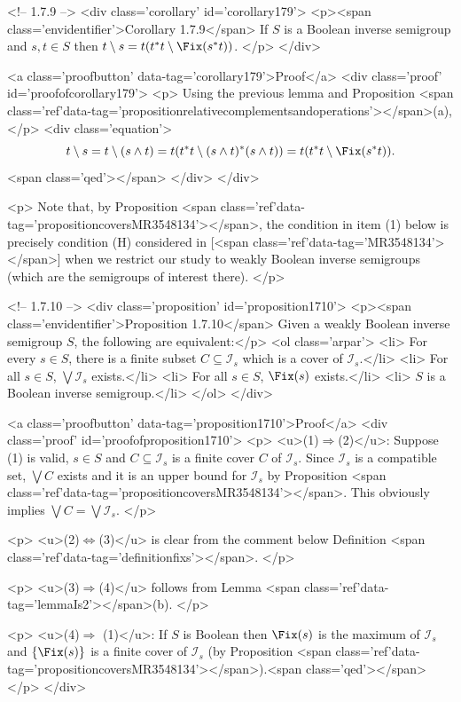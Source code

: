 <!-- 1.7.9 -->
<div class='corollary' id='corollary179'>
	<p><span class='envidentifier'>Corollary 1.7.9</span>
	If $S$ is a Boolean inverse semigroup and $s,t\in S$ then $t\setminus s=t(t^*t\setminus\Fix(s^*t))$.
	</p>
</div>

<a class='proofbutton' data-tag='corollary179'>Proof</a>
<div class='proof' id='proofofcorollary179'>
	<p>
	Using the previous lemma and Proposition <span class='ref'data-tag='propositionrelativecomplementsandoperations'></span>(a),</p>
	<div class='equation'>\[
	t\setminus s=t\setminus(s\land t)=t(t^*t\setminus(s\land t)^*(s\land t))=t(t^*t\setminus\Fix(s^*t)).
	\]<span class='qed'></span>
	</div>
</div>

<p>
Note that, by Proposition <span class='ref'data-tag='propositioncoversMR3548134'></span>, the condition in item (1) below is precisely condition (H) considered in [<span class='ref'data-tag='MR3548134'></span>] when we restrict our study to weakly Boolean inverse semigroups (which are the semigroups of interest there).
</p>

<!-- 1.7.10 -->
<div class='proposition' id='proposition1710'>
	<p><span class='envidentifier'>Proposition 1.7.10</span>
	Given a weakly Boolean inverse semigroup $S$, the following are equivalent:</p>
	<ol class='arpar'>
		<li> For every $s\in S$, there is a finite subset $C\subseteq\mathcal{I}_s$ which is a cover of $\mathcal{I}_s$.</li>
		<li> For all $s\in S$, $\bigvee\mathcal{I}_s$ exists.</li>
		<li> For all $s\in S$, $\Fix(s)$ exists.</li>
		<li> $S$ is a Boolean inverse semigroup.</li>
	</ol>
</div>

<a class='proofbutton' data-tag='proposition1710'>Proof</a>
<div class='proof' id='proofofproposition1710'>
	<p>
	<u>(1)$\Rightarrow$(2)</u>: Suppose (1) is valid, $s\in S$ and $C\subseteq\mathcal{I}_s$ is a finite cover $C$ of $\mathcal{I}_s$. Since $\mathcal{I}_s$ is a compatible set, $\bigvee C$ exists and it is an upper bound for $\mathcal{I}_s$ by Proposition <span class='ref'data-tag='propositioncoversMR3548134'></span>. This obviously implies $\bigvee C=\bigvee\mathcal{I}_s$.
	</p>

	<p>
	<u>(2)$\iff$(3)</u> is clear from the comment below Definition <span class='ref'data-tag='definitionfixs'></span>.
	</p>

	<p>
	<u>(3)$\Rightarrow$(4)</u> follows  from Lemma <span class='ref'data-tag='lemmaIs2'></span>(b).
	</p>

	<p>
	<u>(4)$\Rightarrow$ (1)</u>: If $S$ is Boolean then $\Fix(s)$ is the maximum of $\mathcal{I}_s$ and $\left\{\Fix(s)\right\}$ is a finite cover of $\mathcal{I}_s$ (by Proposition <span class='ref'data-tag='propositioncoversMR3548134'></span>).<span class='qed'></span>
	</p>
</div>

